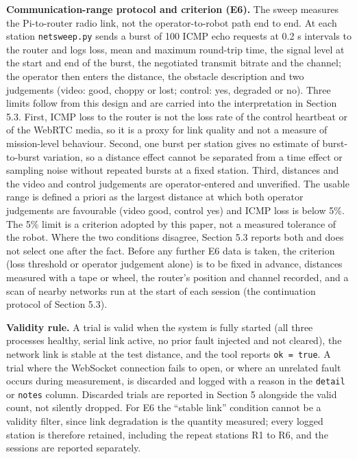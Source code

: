 \textbf{Communication-range protocol and criterion (E6).} The sweep measures the Pi-to-router radio link, not the operator-to-robot path end to end. At each station \texttt{netsweep.py} sends a burst of 100 ICMP echo requests at 0.2 s intervals to the router and logs loss, mean and maximum round-trip time, the signal level at the start and end of the burst, the negotiated transmit bitrate and the channel; the operator then enters the distance, the obstacle description and two judgements (video: good, choppy or lost; control: yes, degraded or no). Three limits follow from this design and are carried into the interpretation in Section 5.3. First, ICMP loss to the router is not the loss rate of the control heartbeat or of the WebRTC media, so it is a proxy for link quality and not a measure of mission-level behaviour. Second, one burst per station gives no estimate of burst-to-burst variation, so a distance effect cannot be separated from a time effect or sampling noise without repeated bursts at a fixed station. Third, distances and the video and control judgements are operator-entered and unverified. The usable range is defined a priori as the largest distance at which both operator judgements are favourable (video good, control yes) and ICMP loss is below 5\%. The 5\% limit is a criterion adopted by this paper, not a measured tolerance of the robot. Where the two conditions disagree, Section 5.3 reports both and does not select one after the fact. Before any further E6 data is taken, the criterion (loss threshold or operator judgement alone) is to be fixed in advance, distances measured with a tape or wheel, the router's position and channel recorded, and a scan of nearby networks run at the start of each session (the continuation protocol of Section 5.3).

\textbf{Validity rule.} A trial is valid when the system is fully started (all three processes healthy, serial link active, no prior fault injected and not cleared), the network link is stable at the test distance, and the tool reports \texttt{ok = true}. A trial where the WebSocket connection fails to open, or where an unrelated fault occurs during measurement, is discarded and logged with a reason in the \texttt{detail} or \texttt{notes} column. Discarded trials are reported in Section 5 alongside the valid count, not silently dropped. For E6 the ``stable link'' condition cannot be a validity filter, since link degradation is the quantity measured; every logged station is therefore retained, including the repeat stations R1 to R6, and the sessions are reported separately.

